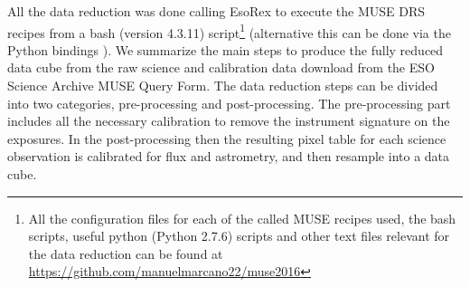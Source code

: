 All the data reduction was done calling EsoRex to execute the MUSE DRS recipes from a bash (version 4.3.11) script\footnote{All the configuration files for each of the called MUSE recipes used, the bash scripts, useful python (Python 2.7.6) scripts and other text files relevant for the data reduction can be found at \url{https://github.com/manuelmarcano22/muse2016}} (alternative this can be done via the Python bindings \citep{streicher_python_2012}). We summarize the main steps to produce the fully reduced data cube from the raw science and calibration data download from the ESO Science Archive MUSE Query Form. The data reduction steps can be divided into two categories, pre-processing and post-processing. The pre-processing part includes all the necessary calibration to remove the instrument signature on the exposures. In the post-processing then the resulting pixel table for each science observation is calibrated for flux and astrometry, and then resample into a data cube.

